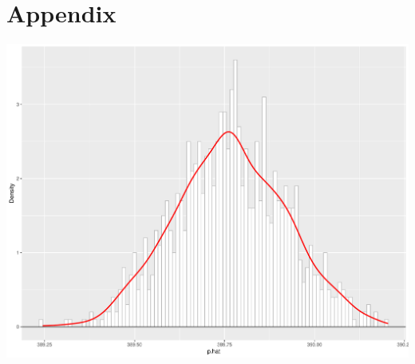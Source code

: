 \documentclass{article}\usepackage[]{graphicx}\usepackage[]{xcolor}
\newenvironment{Figure}
  {\par\medskip\noindent\minipage{\linewidth}}
  {\endminipage\par\medskip}
\begin{document}
\newpage
\onecolumn
\section{Appendix}

\begin{Figure}
\includegraphics[scale=0.4]{resampleplot.pdf}
\label{fig2}
\end{Figure}
\end{document}
